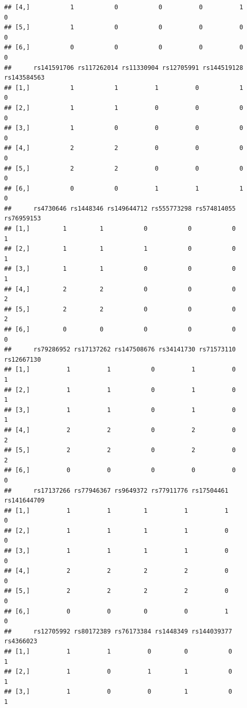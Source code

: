 \documentclass[
]{article}
\begin{document}
\begin{verbatim}
## [4,]           1           0           0          0          1           0
## [5,]           1           0           0          0          0           0
## [6,]           0           0           0          0          0           0
##      rs141591706 rs117262014 rs11330904 rs12705991 rs144519128 rs143584563
## [1,]           1           1          1          0           1           0
## [2,]           1           1          0          0           0           0
## [3,]           1           0          0          0           0           0
## [4,]           2           2          0          0           0           0
## [5,]           2           2          0          0           0           0
## [6,]           0           0          1          1           1           0
##      rs4730646 rs1448346 rs149644712 rs555773298 rs574814055 rs76959153
## [1,]         1         1           0           0           0          1
## [2,]         1         1           1           0           0          1
## [3,]         1         1           0           0           0          1
## [4,]         2         2           0           0           0          2
## [5,]         2         2           0           0           0          2
## [6,]         0         0           0           0           0          0
##      rs79286952 rs17137262 rs147508676 rs34141730 rs71573110 rs12667130
## [1,]          1          1           0          1          0          1
## [2,]          1          1           0          1          0          1
## [3,]          1          1           0          1          0          1
## [4,]          2          2           0          2          0          2
## [5,]          2          2           0          2          0          2
## [6,]          0          0           0          0          0          0
##      rs17137266 rs77946367 rs9649372 rs77911776 rs17504461 rs141644709
## [1,]          1          1         1          1          1           0
## [2,]          1          1         1          1          0           0
## [3,]          1          1         1          1          0           0
## [4,]          2          2         2          2          0           0
## [5,]          2          2         2          2          0           0
## [6,]          0          0         0          0          1           0
##      rs12705992 rs80172389 rs76173384 rs1448349 rs144039377 rs4366023
## [1,]          1          1          0         0           0         1
## [2,]          1          0          1         1           0         1
## [3,]          1          0          0         1           0         1

\end{verbatim}
\end{document}
